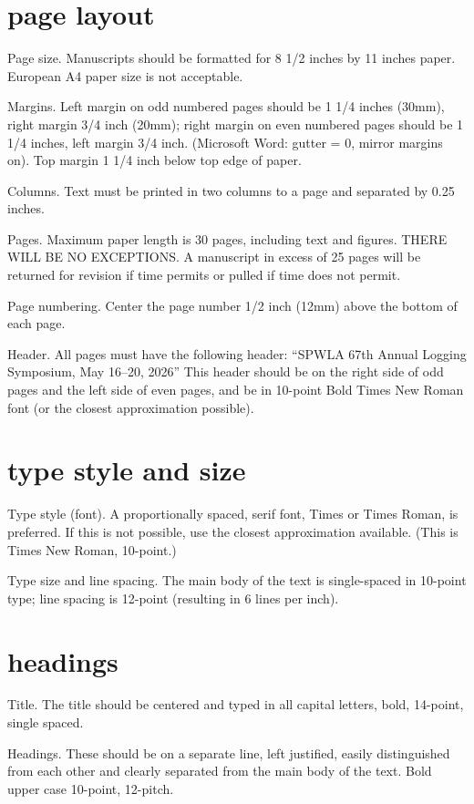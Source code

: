 \documentclass[10pt,twocolumn,twoside]{article}
\begin{document}
\section{page layout}
Page size. Manuscripts should be formatted for 8 1/2 inches by 11 inches paper. European A4 paper size is not acceptable.

Margins. Left margin on odd numbered pages should be 1 1/4 inches (30mm), right margin 3/4 inch (20mm); right margin on even numbered pages should be 1 1/4 inches, left margin 3/4 inch. (Microsoft Word: gutter = 0, mirror margins on). Top margin 1 1/4 inch below top edge of paper.

Columns. Text must be printed in two columns to a page and separated by 0.25 inches. 

Pages. Maximum paper length is 30 pages, including text and figures. THERE WILL BE NO EXCEPTIONS. A manuscript in excess of 25 pages will be returned for revision if time permits or pulled if time does not permit.

Page numbering. Center the page number 1/2 inch (12mm) above the bottom of each page.

Header. All pages must have the following header: “SPWLA 67th Annual Logging
Symposium, May 16--20, 2026” This header should be on the right side of odd pages and the left side of even pages, and be in 10-point Bold Times New Roman font (or the closest approximation possible).

\section{type style and size}
Type style (font). A proportionally spaced, serif font, Times or Times Roman, is preferred. If this is not possible, use the closest approximation available. (This is Times New Roman, 10-point.)

Type size and line spacing. The main body of the text is single-spaced in 10-point type; line spacing is 12-point (resulting in 6 lines per inch).

\section{headings}

Title. The title should be centered and typed in all capital letters, bold, 14-point, single spaced.

Headings. These should be on a separate line, left justified, easily distinguished from each other and clearly separated from the main body of the text. Bold upper case 10-point, 12-pitch.
\end{document}
